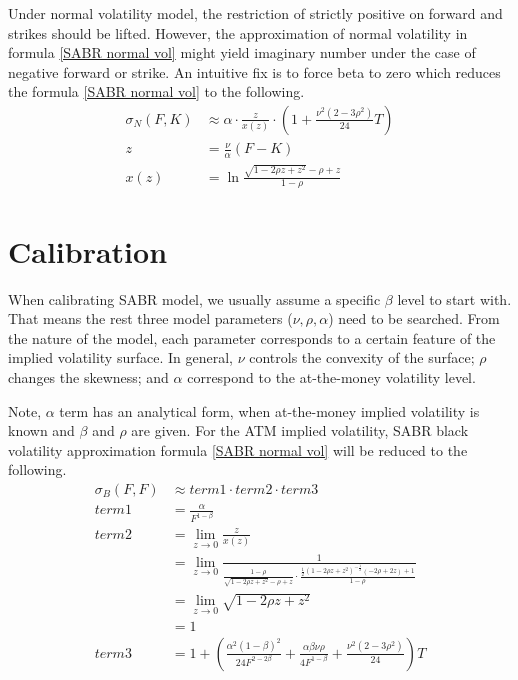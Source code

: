 \documentclass{article}
\begin{document}
Under normal volatility model, the restriction of strictly positive on forward and strikes should be lifted.
However, the approximation of normal volatility in formula \ref{SABR normal vol} might yield imaginary number under the case of negative forward or strike. An intuitive fix is to force beta to zero which reduces the formula \ref{SABR normal vol} to the following.
\begin{subequations} \label{SABR normal vol with zero beta}
    \begin{align}
        \sigma_N\left(F, K\right) &\approx \alpha \cdot \frac{z}{x\left(z\right)} \cdot \left(1 + \frac{\nu^2 \left(2 - 3 \rho^2\right)}{24} T\right) \\
        z &= \frac{\nu}{\alpha} \left(F - K\right) \\
        x\left(z\right) &= \ln{\frac{\sqrt{1 - 2 \rho z + z^2} - \rho + z}{1 - \rho}}
    \end{align}
\end{subequations}


\section{Calibration}

When calibrating SABR model, we usually assume a specific $ \beta $ level to start with.
That means the rest three model parameters ($ \nu, \rho, \alpha $) need to be searched.
From the nature of the model, each parameter corresponds to a certain feature of the implied volatility surface.
In general, $ \nu $ controls the convexity of the surface;
$ \rho $ changes the skewness;
and $ \alpha $ correspond to the at-the-money volatility level.

Note, $ \alpha $ term has an analytical form, when at-the-money implied volatility is known and $ \beta $ and $ \rho $ are given.
For the ATM implied volatility, SABR black volatility approximation formula \ref{SABR normal vol} will be reduced to the following.
\begin{align}
    \sigma_B\left(F, F\right) &\approx term1 \cdot term2 \cdot term3 \\
    term1 &= \frac{\alpha}{F^{1 - \beta}} \nonumber \\
    term2 &= \lim_{z \to 0} \frac{z}{x(z)} \nonumber \\
    &= \lim_{z \to 0} \frac{1}{\frac{1 - \rho}{\sqrt{1 - 2 \rho z + z^2} - \rho + z} \cdot \frac{\frac{1}{2} {(1 - 2 \rho z + z^2)}^{-\frac{1}{2}} (- 2 \rho + 2 z) + 1}{1 - \rho}} \nonumber \\
    &= \lim_{z \to 0} \sqrt{1 - 2 \rho z + z^2} \nonumber \\
    &= 1 \nonumber \\
    term3 &= 1 + \left(\frac{\alpha^2 {(1 - \beta)}^2}{24 F^{2 - 2\beta}} + \frac{\alpha \beta \nu \rho}{4 F^{1 - \beta}} + \frac{\nu^2 \left(2 - 3 \rho^2\right)}{24} \right) T \nonumber
\end{align}
\end{document}
